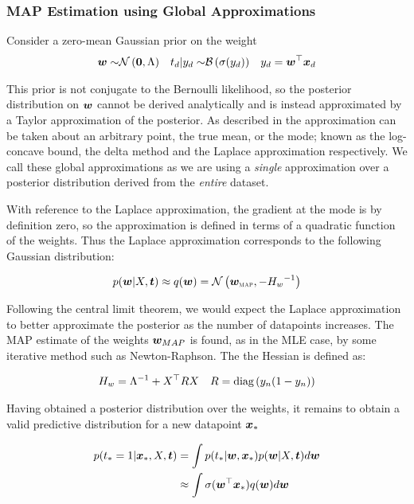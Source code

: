 \subsubsection*{MAP Estimation using Global Approximations}
\newcommand \wmap[0] { \vv{w}_{\text{\tiny \sc MAP}} }

Consider a zero-mean Gaussian prior on the weight
\begin{align}\bm w \sim & \mathcal{N} \left( {\bm 0}, {\Lambda} \right) &
t_d | y_d \sim & \mathcal{B}\left( \sigma(y_d) \right) & 
y_d = \bm w^\top\bm x_d  \label{eqn:bayes-logit-model}
\end{align}

This prior is not conjugate to the Bernoulli likelihood, so the posterior distribution on $\bm w$ cannot be derived analytically and is instead approximated by a Taylor approximation of the posterior. As described in \cite{Wang2013} the approximation can be taken about an arbitrary point, the true mean, or the mode; known as the log-concave bound, the delta method and the Laplace approximation respectively. We call these global approximations as we are using a \emph{single} approximation over a posterior distribution derived from the \emph{entire} dataset.

With reference to the Laplace approximation, the gradient at the mode is by definition zero, so the approximation is defined in terms of a quadratic function of the weights. Thus the Laplace approximation corresponds to the following Gaussian distribution:

\begin{equation}
p(\vv{w}|X,\vv{t}) \approx q(\vv{w}) = \nor{\wmap}{-\inv{H_w}}
\end{equation}

Following the central limit theorem, we would expect the Laplace approximation to better approximate the posterior as the number of datapoints increases. The MAP estimate of the weights $\bm w_{MAP}$ is found, as in the MLE case, by some iterative method such as Newton-Raphson. The the Hessian is defined as:

\begin{align}
H_w   & = {\Lambda}^{-1} + X^\top R X & R = \text{diag} \left( {y_n(1 - y_n)} \right) 
\end{align}

Having obtained a posterior distribution over the weights, it remains to obtain a valid predictive distribution for a new datapoint $\bm x_*$

\begin{align}
p(t_* = 1| \bm x_*, X, \bm t) & = \int p(t_*|\bm w, \bm x_*)p(\bm w|X,\bm t) d\bm w \label{eqn:log-reg-predict} \\
 & \approx \int \sigma(\bm w^\top\bm x_*)q(\bm w) d\bm w \label{eqn:log-reg-predict-approx-q}
\end{align}

